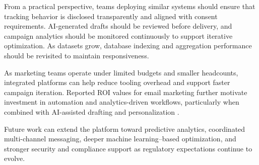 \documentclass[12pt,journal,compsoc]{IEEEtran}
\begin{document}
From a practical perspective, teams deploying similar systems should ensure that tracking behavior is disclosed transparently and aligned with consent requirements. AI-generated drafts should be reviewed before delivery, and campaign analytics should be monitored continuously to support iterative optimization. As datasets grow, database indexing and aggregation performance should be revisited to maintain responsiveness.

As marketing teams operate under limited budgets and smaller headcounts, integrated platforms can help reduce tooling overhead and support faster campaign iteration. Reported ROI values for email marketing further motivate investment in automation and analytics-driven workflows, particularly when combined with AI-assisted drafting and personalization \cite{ref1}.

Future work can extend the platform toward predictive analytics, coordinated multi-channel messaging, deeper machine learning--based optimization, and stronger security and compliance support as regulatory expectations continue to evolve.
\end{document}
